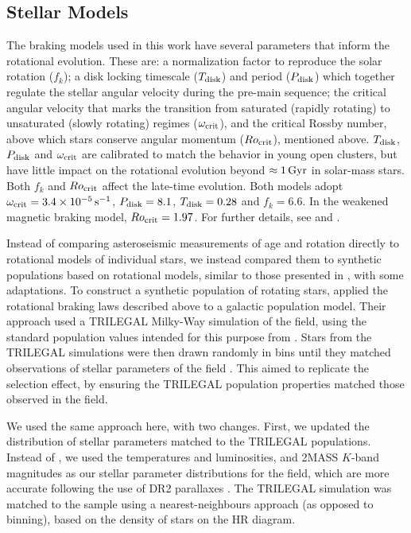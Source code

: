 \subsection{Stellar Models}\label{ssec:models}
The braking models used in this work have several parameters that inform the rotational evolution. These are: a normalization factor to reproduce the solar rotation ($f_k$); a disk locking timescale ($T_{\rm disk}$) and period ($P_{\rm disk}$) which together regulate the stellar angular velocity during the pre-main sequence; the critical angular velocity that marks the transition from saturated (rapidly rotating) to unsaturated (slowly rotating) regimes ($\omega_{\rm crit}$), and the critical Rossby number, above which stars conserve angular momentum ($Ro_{\rm crit}$), mentioned above. $T_{\rm disk}$, $P_{\rm disk}$ and $\omega_{\rm crit}$ are calibrated to match the behavior in young open clusters, but have little impact on the rotational evolution beyond $\approx 1\, \rm{Gyr}$ in solar-mass stars. Both $f_k$ and $Ro_{\rm crit}$ affect the late-time evolution. Both models adopt $\omega_{\rm crit} = 3.4  \times 10^{-5}\, \rm{s}^{-1}$, $P_{\rm disk} = 8.1$, $T_{\rm disk} = 0.28$ and $f_k = 6.6$. In the weakened magnetic braking model, $Ro_{\rm crit} = 1.97$. For further details, see \cite{vansaders+pinsonneault2013} and \cite{vansaders+2016, vansaders+2019}.

Instead of comparing asteroseismic measurements of age and rotation directly to rotational models of individual stars, we instead compared them to synthetic populations based on rotational models, similar to those presented in \cite{vansaders+2019}, with some adaptations. To construct a synthetic population of rotating stars, \cite{vansaders+2019} applied the rotational braking laws described above to a galactic population model. Their approach used a TRILEGAL \cite{girardi+2012} Milky-Way simulation of the \kepler field, using the standard population values intended for this purpose from \cite{girardi+2015}. Stars from the TRILEGAL simulations were then drawn randomly in bins until they matched observations of stellar parameters of the \kepler field \cite{mathur+2017}. This aimed to replicate the \kepler selection effect, by ensuring the TRILEGAL population properties matched those observed in the \kepler field.

We used the same approach here, with two changes. First, we updated the distribution of stellar parameters matched to the TRILEGAL populations. Instead of \cite{mathur+2017}, we used the \cite{berger+2020} temperatures and luminosities, and 2MASS $K$-band magnitudes as our stellar parameter distributions for the \kepler field, which are more accurate following the use of \gaia DR2 parallaxes \cite{gaiacollaboration+2018}. The TRILEGAL simulation was matched to the \cite{berger+2020} sample using a nearest-neighbours approach (as opposed to binning), based on the density of stars on the HR diagram.

